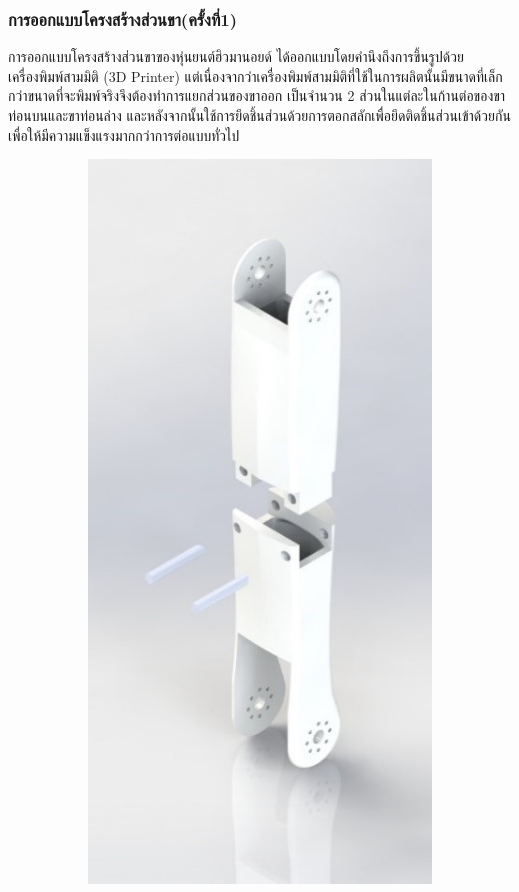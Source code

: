 \subsubsection*{การออกแบบโครงสร้างส่วนขา(ครั้งที่1)}
การออกแบบโครงสร้างส่วนขาของหุ่นยนต์ฮิวมานอยด์ ได้ออกแบบโดยคำนึงถึงการขึ้นรูปด้วยเครื่องพิมพ์สามมิติ (3D Printer) 
แต่เนื่องจากว่าเครื่องพิมพ์สามมิติที่ใช้ในการผลิตนั้นมีขนาดที่เล็กกว่าขนาดที่จะพิมพ์จริงจึงต้องทำการแยกส่วนของขาออก
เป็นจำนวน 2 ส่วนในแต่ละในก้านต่อของขาท่อนบนและขาท่อนล่าง และหลังจากนั้นใช้การยึดชิ้นส่วนด้วยการตอกสลักเพื่อยึดติดชิ้นส่วนเข้าด้วยกัน
เพื่อให้มีความแข็งแรงมากกว่าการต่อแบบทั่วไป

\begin{figure}[h!]
    \centering
    \begin{subfigure}[b]{0.3\linewidth}
      \includegraphics[width=\linewidth]{chapter4/images/shin.jpg}

\end{subfigure}
\end{figure}
